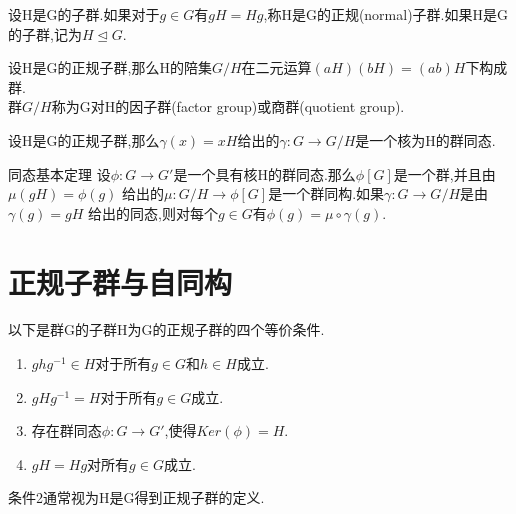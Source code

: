 \documentclass[oneside,openany]{ctexbook}
\begin{document}
\begin{definition}{}{}
设H是G的子群.如果对于$g\in G$有$gH=Hg$,称H是G的正规(normal)子群.如果H是G的子群,记为$H\unlhd G$.
\end{definition}

\begin{definition}{}{}
设H是G的正规子群,那么H的陪集$G/H$在二元运算$(aH)(bH)=(ab)H$下构成群.\\
群$G/H$称为G对H的因子群(factor group)或商群(quotient group).
\end{definition}

\begin{definition}{}{}
设H是G的正规子群,那么$\gamma (x)=xH$给出的$\gamma :G\rightarrow G/H$是一个核为H的群同态. 
\end{definition}

\begin{definition}{同态基本定理}{}
设$\phi :G\rightarrow G'$是一个具有核H的群同态.那么$\phi [G]$是一个群,并且由$\mu (gH)=\phi (g)$
给出的$\mu :G/H\rightarrow \phi [G]$是一个群同构.如果$\gamma :G\rightarrow G/H$是由$\gamma (g)=gH$
给出的同态,则对每个$g\in G$有$\phi (g)=\mu \circ \gamma(g)$.
\end{definition}

\begin{figure}
  \centering
\end{figure}

\section{正规子群与自同构}

\begin{definition}{}{}
以下是群G的子群H为G的正规子群的四个等价条件.
\begin{enumerate}
  \item $ghg^{-1}\in H$对于所有$g\in G$和$h\in H$成立.
  \item $gHg^{-1}=H$对于所有$g\in G$成立.
  \item 存在群同态$\phi :G\rightarrow G'$,使得$Ker(\phi)=H$.
  \item $gH=Hg$对所有$g\in G$成立.
\end{enumerate}
条件2通常视为H是G得到正规子群的定义.
\end{definition}
\end{document}
